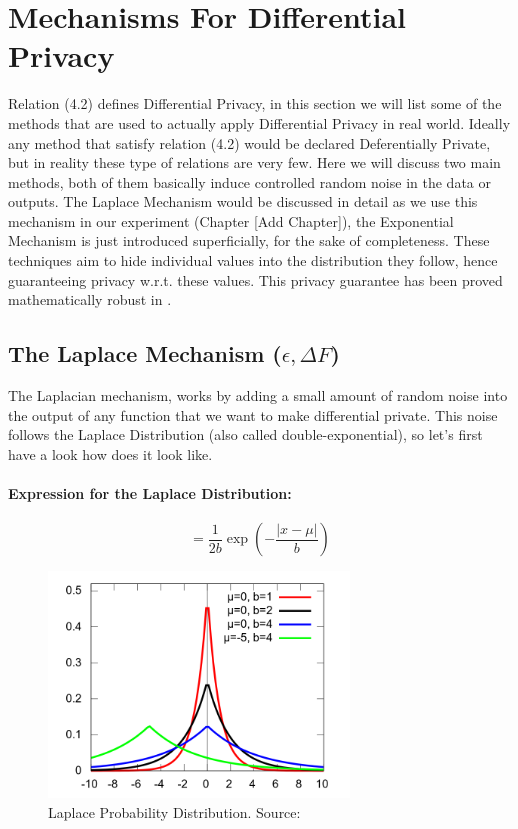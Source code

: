 \documentclass[12pt]{report}
\theoremstyle{named}
\begin{document}
\section{Mechanisms For Differential Privacy}
Relation (4.2) defines Differential Privacy, in this section we will list some of the methods that are used to actually apply Differential Privacy in real world. Ideally any method that satisfy relation (4.2) would be declared Deferentially Private, but in reality these type of relations are very few. Here we will discuss two main methods, both of them basically induce controlled random noise in the data or outputs. The Laplace Mechanism would be discussed in detail as we use this mechanism in our experiment (Chapter [Add Chapter]), the Exponential Mechanism is just introduced superficially, for the sake of completeness.  These techniques aim to hide individual values into the distribution they follow, hence guaranteeing privacy w.r.t. these values. This privacy guarantee has been proved mathematically robust in \cite{dwork2014algorithmic}.

\subsection{The Laplace Mechanism ($\epsilon, \Delta F$)}
\label{sec:LaplaceMecha}
The Laplacian mechanism, works by adding a small amount of random noise into the output of any function that we want to make differential private. This noise follows the Laplace Distribution (also called double-exponential), so let's first have a look how does it look like.

\paragraph{Expression for the Laplace Distribution:\\}
\begin{equation}
=\frac{1}{2b} \exp(-\frac{\left | x-\mu  \right |}{b})
\end{equation}
\begin{figure}[ht]
\centering
        \includegraphics[width=80mm,scale=1]{Images/LaplaceDistribution.png}
    \caption{Laplace Probability Distribution. Source:\cite{LaplaceDist}}
    \label{fig:laplace}
\end{figure}
\end{document}
